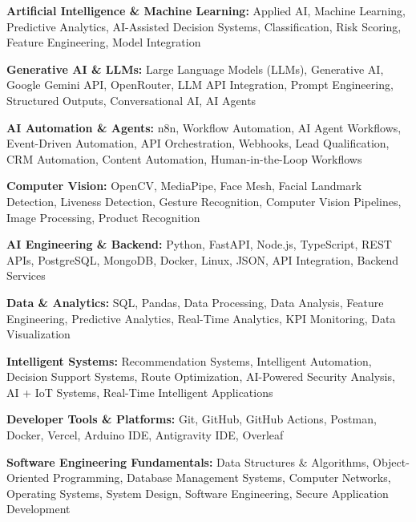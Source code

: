 \documentclass[a4paper,11pt]{article}
\begin{document}
\begin{itemize}[leftmargin=0in, label={}]

\small{

\item{
\textbf{Artificial Intelligence \& Machine Learning:} Applied AI, Machine Learning, Predictive Analytics, AI-Assisted Decision Systems, Classification, Risk Scoring, Feature Engineering, Model Integration
}

\item{
\textbf{Generative AI \& LLMs:} Large Language Models (LLMs), Generative AI, Google Gemini API, OpenRouter, LLM API Integration, Prompt Engineering, Structured Outputs, Conversational AI, AI Agents
}

\item{
\textbf{AI Automation \& Agents:} n8n, Workflow Automation, AI Agent Workflows, Event-Driven Automation, API Orchestration, Webhooks, Lead Qualification, CRM Automation, Content Automation, Human-in-the-Loop Workflows
}

\item{
\textbf{Computer Vision:} OpenCV, MediaPipe, Face Mesh, Facial Landmark Detection, Liveness Detection, Gesture Recognition, Computer Vision Pipelines, Image Processing, Product Recognition
}

\item{
\textbf{AI Engineering \& Backend:} Python, FastAPI, Node.js, TypeScript, REST APIs, PostgreSQL, MongoDB, Docker, Linux, JSON, API Integration, Backend Services
}

\item{
\textbf{Data \& Analytics:} SQL, Pandas, Data Processing, Data Analysis, Feature Engineering, Predictive Analytics, Real-Time Analytics, KPI Monitoring, Data Visualization
}

\item{
\textbf{Intelligent Systems:} Recommendation Systems, Intelligent Automation, Decision Support Systems, Route Optimization, AI-Powered Security Analysis, AI + IoT Systems, Real-Time Intelligent Applications
}

\item{
\textbf{Developer Tools \& Platforms:} Git, GitHub, GitHub Actions, Postman, Docker, Vercel, Arduino IDE, Antigravity IDE, Overleaf
}

\item{
\textbf{Software Engineering Fundamentals:} Data Structures \& Algorithms, Object-Oriented Programming, Database Management Systems, Computer Networks, Operating Systems, System Design, Software Engineering, Secure Application Development
}

}

\end{itemize}
\end{document}
